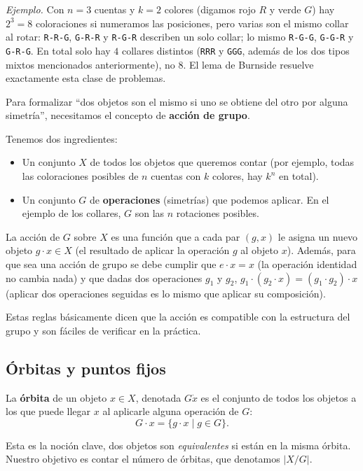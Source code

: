 \textit{Ejemplo.} Con $n=3$ cuentas y $k=2$ colores (digamos rojo $R$ y verde $G$) hay $2^3=8$ coloraciones si numeramos las posiciones, pero varias son el mismo collar al rotar: \texttt{R-R-G}, \texttt{G-R-R} y \texttt{R-G-R} describen un solo collar; lo mismo \texttt{R-G-G}, \texttt{G-G-R} y \texttt{G-R-G}. En total solo hay $4$ collares distintos (\texttt{RRR} y \texttt{GGG}, además de los dos tipos mixtos mencionados anteriormente), no $8$. El lema de Burnside resuelve exactamente esta clase de problemas.

Para formalizar ``dos objetos son el mismo si uno se obtiene del otro por alguna simetría'', necesitamos el concepto de \textbf{acción de grupo}.

Tenemos dos ingredientes:
\begin{itemize}
    \item Un conjunto $X$ de todos los objetos que queremos contar (por ejemplo, todas las coloraciones posibles de $n$ cuentas con $k$ colores, hay $k^n$ en total).
    \item Un conjunto $G$ de \textbf{operaciones} (simetrías) que podemos aplicar. En el ejemplo de los collares, $G$ son las $n$ rotaciones posibles.
\end{itemize}

La acción de $G$ sobre $X$ es una función que a cada par $(g, x)$ le asigna un nuevo objeto $g \cdot x \in X$ (el resultado de aplicar la operación $g$ al objeto $x$). Además, para que sea una acción de grupo se debe cumplir que $e \cdot x = x$ (la operación identidad no cambia nada) y que dadas dos operaciones $g_1$ y $g_2$, $g_1 \cdot (g_2 \cdot x) = (g_1 \cdot g_2) \cdot x$ (aplicar dos operaciones seguidas es lo mismo que aplicar su composición).

Estas reglas básicamente dicen que la acción es compatible con la estructura del grupo y son fáciles de verificar en la práctica.

\subsection{Órbitas y puntos fijos}

La \textbf{órbita} de un objeto $x \in X$, denotada $G \dot x$ es el conjunto de todos los objetos a los que puede llegar $x$ al aplicarle alguna operación de $G$:
\[
G \cdot x = \{g \cdot x \mid g \in G\}.
\]

Esta es la noción clave, dos objetos son \emph{equivalentes} si están en la misma órbita. Nuestro objetivo es contar el número de órbitas, que denotamos $|X/G|$.

